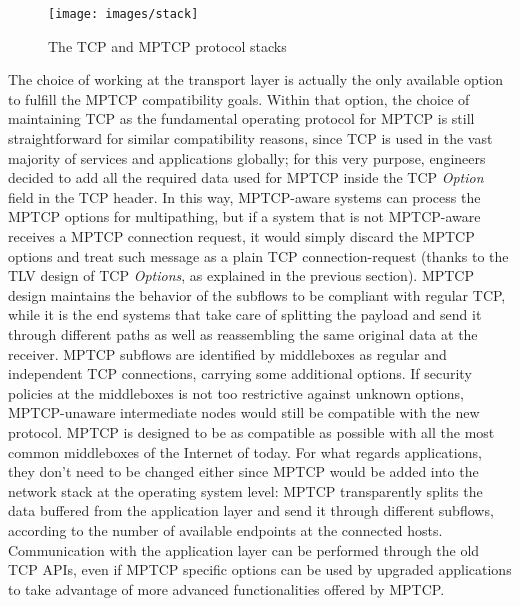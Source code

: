 \begin{figure}[!htb]
\centering
\texttt{[image: images/stack]}
\caption{The TCP and MPTCP protocol stacks}
\label{fig:stack}
\end{figure}

The choice of working at the transport layer is actually the only available option to fulfill the MPTCP compatibility goals. Within that option, the choice of maintaining TCP as the fundamental operating protocol for MPTCP is still straightforward for similar compatibility reasons, since TCP is used in the vast majority of services and applications globally; for this very purpose, engineers decided to add all the required data used for MPTCP inside the TCP \textit{Option} field in the TCP header. In this way, MPTCP-aware systems can process the MPTCP options for multipathing, but if a system that is not MPTCP-aware receives a MPTCP connection request, it would simply discard the MPTCP options and treat such message as a plain TCP connection-request (thanks to the TLV design of TCP \textit{Options}, as explained in the previous section). 
MPTCP design maintains the behavior of the subflows to be compliant with regular TCP, while it is the end systems that take care of splitting the payload and send it through different paths as well as reassembling the same original data at the receiver. MPTCP subflows are identified by middleboxes as regular and independent TCP connections, carrying some additional options. If security policies at the middleboxes is not too restrictive against unknown options, MPTCP-unaware intermediate nodes would still be compatible with the new protocol. MPTCP is designed to be as compatible as possible with all the most common middleboxes of the Internet of today.
For what regards applications, they don't need to be changed either since MPTCP would be added into the network stack at the operating system level: MPTCP transparently splits the data buffered from the application layer and send it through different subflows, according to the number of available endpoints at the connected hosts. Communication with the application layer can be performed through the old TCP APIs, even if MPTCP specific options can be used by upgraded applications to take advantage of more advanced functionalities offered by MPTCP.

